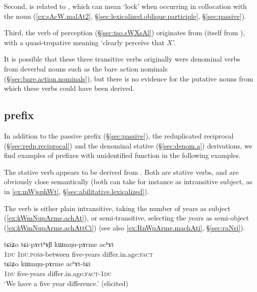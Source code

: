 Second,   is related to , which can mean `lock' when occurring in collocation with the noun  (\ref{ex:sAcW.malAt2}, §\ref{sec:lexicalized.oblique.participle}, §\ref{sec:passive}).

Third,  the verb of perception  (§\ref{sec:tso.sWXsAl}) originates from  (itself from ), with a quasi-tropative meaning  `clearly perceive that $X$'.

It is possible that these three transitive verbs originally were denominal verbs from deverbal nouns such as the bare action nominals (§\ref{sec:bare.action.nominals}), but there is no evidence for the putative nouns from which these verbs could have been derived.

\subsection{ prefix  } \label{sec:a.non.passive.denominal}
In addition to the passive  prefix (§\ref{sec:passive}), the reduplicated reciprocal (§\ref{sec:redp.reciprocal}) and the denominal stative  (§\ref{sec:denom.a}) derivations, we find examples of  prefixes with unidentified function in the following examples.


The stative verb  appears to be derived from . Both are stative verbs, and are obviously close semantically (both can take for instance  as intransitive subject, as in \ref{ex:mWjsphWt}, §\ref{sec:abilitative.lexicalized}). 

The verb  is either plain intransitive, taking the number of years as subject (\ref{ex:kWmNupArme.achAt}), or semi-transitive, selecting the years as semi-object (\ref{ex:kWmNupArme.achAttCi})  (see also \ref{ex:RnWpArme.machAti}, §\ref{sec:raNri}).

\begin{exe}
\ex \label{ex:kWmNupArme.achAt}
\begin{xlist}
\ex 
\gll tɕiʑo tɕi-pɤrtʰɤβ kɯmŋu-pɤrme acʰɤt \\
\textsc{1du} \textsc{1du}.\textsc{poss}-between five-years differ.in.age:\textsc{fact} \\
\ex \label{ex:kWmNupArme.achAttCi}
\gll tɕiʑo kɯmŋu-pɤrme acʰɤt-tɕi \\
\textsc{1du} five-years differ.in.age:\textsc{fact}-\textsc{1du} \\
\glt `We have a five year difference.' (elicited)
\end{xlist}
\end{exe}

